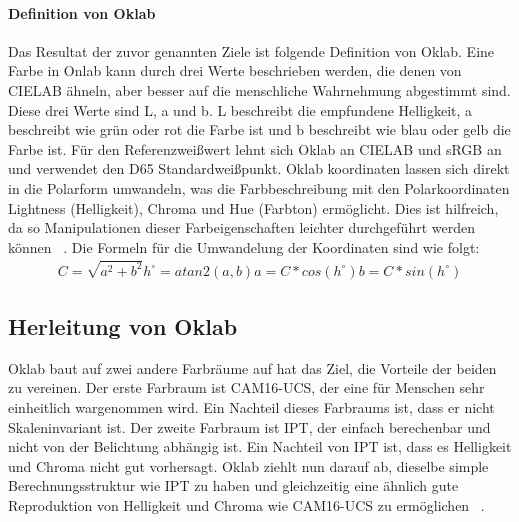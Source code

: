 \documentclass[12pt, a4paper, ngerman]{article}
\begin{document}
\paragraph{Definition von Oklab}
Das Resultat der zuvor genannten Ziele ist folgende Definition von Oklab.
Eine Farbe in Onlab kann durch drei Werte beschrieben werden, die denen von CIELAB ähneln, 
aber besser auf die menschliche Wahrnehmung abgestimmt sind.
Diese drei Werte sind L, a und b. 
L beschreibt die empfundene Helligkeit, a beschreibt wie grün oder rot die Farbe ist und b beschreibt wie blau oder gelb die Farbe ist.
Für den Referenzweißwert lehnt sich Oklab an CIELAB und sRGB an und verwendet den D65 Standardweißpunkt.
Oklab koordinaten lassen sich direkt in die Polarform umwandeln, 
was die Farbbeschreibung mit den Polarkoordinaten Lightness (Helligkeit), Chroma und Hue (Farbton) ermöglicht.
Dies ist hilfreich, da so Manipulationen dieser Farbeigenschaften leichter durchgeführt werden können ~\cite{Oklab_2020}.
Die Formeln für die Umwandelung der Koordinaten sind wie folgt:
\begin{equation}
  \begin{aligned}
    C=\sqrt{ a^2 + b^2 }
    h^\circ = atan2\left( a, b \right)
    a = C*cos\left( h^\circ \right)
    b = C*sin\left( h^\circ \right)
  \end{aligned}
\end{equation}


\subsection{Herleitung von Oklab}
Oklab baut auf zwei andere Farbräume auf hat das Ziel, die Vorteile der beiden zu vereinen.
Der erste Farbraum ist CAM16-UCS, der eine für Menschen sehr einheitlich wargenommen wird.
Ein Nachteil dieses Farbraums ist, dass er nicht Skaleninvariant ist.
Der zweite Farbraum ist IPT, der einfach berechenbar und nicht von der Belichtung abhängig ist.
Ein Nachteil von IPT ist, dass es Helligkeit und Chroma nicht gut vorhersagt.
Oklab ziehlt nun darauf ab, dieselbe simple Berechnungsstruktur wie IPT zu haben und 
gleichzeitig eine ähnlich gute Reproduktion von Helligkeit und Chroma wie CAM16-UCS zu ermöglichen ~\cite{Oklab_2020}.
\end{document}
